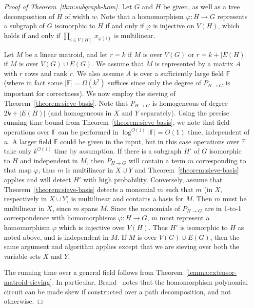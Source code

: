 \documentclass[10pt,a4paper]{article}
\newcommand{\F}{\ensuremath{\mathbb F}\xspace}
\begin{document}
\begin{proof}[Proof of Theorem~\ref{thm:subgraph-hom}]
  Let $G$ and $H$ be given, as well as a tree decomposition of $H$ of
  width $w$. Note that a homomorphism $\varphi \colon H \to G$
  represents a subgraph of $G$ isomorphic to $H$ if and only if
  $\varphi$ is injective on $V(H)$, which holds if and only if
  $\prod_{i \in V(H)} x_{\varphi(i)}$ is multilinear. 
  
  Let $M$ be a linear matroid, and let $r=k$ if $M$ is over
  $V(G)$ or 
  $r=k+|E(H)|$ if $M$ is over $V(G) \cup E(G)$. We assume that $M$ is represented by a matrix
  $A$ with $r$ rows and rank $r$. We also assume $A$ is over a
  sufficiently large field $\F$ (where in fact some $|\F|=\Omega(k^2)$ suffices
  since only the degree of $P_{H \to G}$ is important for correctness).
  We now employ the sieving of Theorem~\ref{theorem:sieve-basis}.
  Note that $P_{H \to G}$ is homogeneous of degree $2k+|E(H)|$
  (and homogeneous in $X$ and $Y$ separately). Using the precise
  running time bound from Theorem~\ref{theorem:sieve-basis},
  we note that field operations over $\F$ can be performed
  in $\log^{O(1)} |\F|=\tilde O(1)$ time, independent of $n$.
  A larger field $\F$ could be given in the input, but in this case
  operations over $\F$ take only $k^{O(1)}$ time by assumption.
  If there is a subgraph $H'$ of $G$ isomorphic to $H$ and independent
  in $M$, then $P_{H \to G}$ will contain a term $m$ corresponding to that
  map $\varphi$, thus $m$ is multilinear in $X \cup Y$ and
  Theorem~\ref{theorem:sieve-basis} applies and will detect $H'$ with
  high probability. Conversely, assume that Theorem~\ref{theorem:sieve-basis}
  detects a monomial $m$ such that $m$ (in $X$, respectively in $X \cup Y$)
  is multilinear and contains a basis for $M$. Then $m$ must be
  multilinear in $X$, since $m$ spans $M$. Since the monomials of
  $P_{H \to G}$ are in 1-to-1 correspondence with homomorphisms
  $\varphi \colon H \to G$, $m$ must represent a homomorphism $\varphi$
  which is injective over $V(H)$. Thus $H'$ is isomorphic to $H$ as
  noted above, and is independent in $M$. If $M$ is over $V(G) \cup E(G)$,
  then the same argument and algorithm applies except that we are
  sieving over both the variable sets $X$ and $Y$. 

  The running time over a general field follows from
  Theorem~\ref{lemma:extensor-matroid-sieving}. In particular, Brand~\cite{Brand19thesis}
  notes that the homomorphism polynomial circuit can be made skew if
  constructed over a path decomposition, and not otherwise.
\end{proof}
\end{document}
